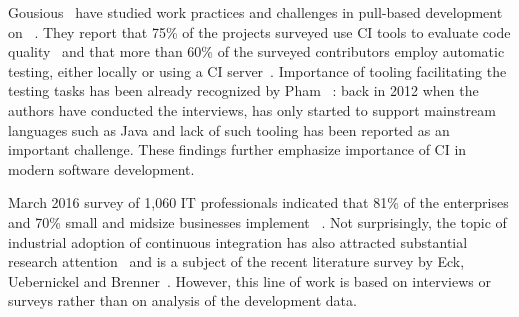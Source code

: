 Gousious \etal\ have studied work practices and challenges in pull-based
development on \GH~\cite{gousios2015work, gousios2016work}. 
They report that 75\% of the projects surveyed use CI tools to evaluate
code quality~\cite{gousios2015work} and that more than 60\% of the surveyed 
contributors employ automatic testing, either locally or using a CI server~\cite{gousios2016work}. 
Importance of tooling facilitating the testing tasks has been already recognized by 
Pham \etal~\cite{pham2013creating}: back in 2012 when the authors have conducted
the interviews, \Tvis has only started to support mainstream languages such as Java 
and lack of such tooling has been reported as an important challenge.
These findings further emphasize importance of CI in modern software development. 

March 2016 survey of 1,060 IT professionals indicated that 81\% of the enterprises 
and 70\% small and midsize businesses implement \DO~\cite{rightscale}. 
Not surprisingly, the topic of industrial adoption of continuous integration 
has also attracted substantial research attention~\cite{hilton2016continuous,Leppanen2015,Laukkanen2015Agile,Debbiche2014,Stahl2014ICSEComp,Stahl2014JSS} and is a subject of the recent literature survey by Eck, Uebernickel and Brenner~\cite{EckUB14}. 
However, this line of work is based on interviews or surveys rather than on analysis of the development data.


